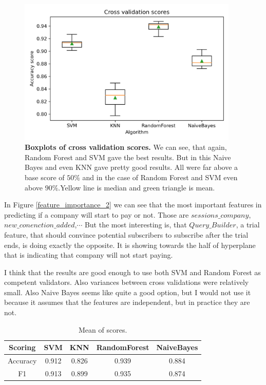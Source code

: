 \documentclass[fleqn,moreauthors,10pt]{ds_report}
\begin{document}
\begin{figure}[h]\centering
	\includegraphics[width=\linewidth, height=7cm]{problem_2_boxplot_all_data.png}
	
	\caption{\textbf{Boxplots of cross validation scores.} We can see, that again, Random Forest and SVM gave the best results. But in this Naive Bayes and even KNN gave pretty good results. All were far above a base score of $50\%$ and in the case of Random Forest and SVM even above $90\%$.Yellow line is median and green triangle is mean. }
	\label{boxplot2}
\end{figure}

In Figure \ref{feature_importance_2} we can see that the most important features in predicting if a company will start to pay or not. Those are $sessions\_company$, $new\_conenction\_added$,$\cdots$  But the most interesting is, that $Query\_Builder$, a trial feature, that should convince potential subscribers to subscribe after the trial ends, is doing exactly the opposite.  It is showing towards the half of hyperplane that is indicating that company will not start paying.

I think that the results are good enough to use both SVM and Random Forest as competent validators. Also variances between cross validations were relatively small. Also Naive Bayes seems like quite a good option, but I would not use it because it assumes that the features are independent, but in practice they are not. 


\begin{center}
\begin{table}
\caption{\label{table_2} Mean of scores.}

\begin{tabular}{|c|| c| c| c| c|} 
 \hline
 Scoring  & SVM & KNN & RandomForest  & NaiveBayes\\ 
 \hline\hline
 Accuracy & 0.912 & 0.826 &  0.939 & 0.884\\ 
 \hline
 F1 & 0.913 & 0.899 & 0.935 & 0.874 \\
 \hline
\end{tabular}
\end{table}
\end{center}
\end{document}
